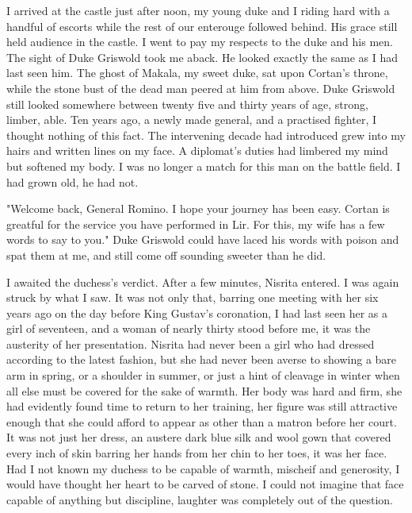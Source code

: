 \documentclass{article}
\begin{document}
\vspace{.5cm}

I arrived at the castle just after noon, my young duke and I riding hard with a handful of escorts while the rest of our enterouge followed behind. His grace still held audience in the castle. I went to pay my respects to the duke and his men. The sight of Duke Griswold took me aback. He looked exactly the same as I had last seen him. The ghost of Makala, my sweet duke, sat upon Cortan's throne, while the stone bust of the dead man peered at him from above. Duke Griswold still looked somewhere between twenty five and thirty years of age, strong, limber, able. Ten years ago, a newly made general, and a practised fighter, I thought nothing of this fact. The intervening decade had introduced grew into my hairs and written lines on my face. A diplomat's duties had limbered my mind but softened my body. I was no longer a match for this man on the battle field. I had grown old, he had not.

"Welcome back, General Romino. I hope your journey has been easy. Cortan is greatful for the service you have performed in Lir. For this, my wife has a few words to say to you." Duke Griswold could have laced his words with poison and spat them at me, and still come off sounding sweeter than he did. 

I awaited the duchess's verdict. After a few minutes, Nisrita entered. I was again struck by what I saw. It was not only that, barring one meeting with her six years ago on the day before King Gustav's coronation, I had last seen her as a girl of seventeen, and a woman of nearly thirty stood before me, it was the austerity of her presentation. Nisrita had never been a girl who had dressed according to the latest fashion, but she had never been averse to showing a bare arm in spring, or a shoulder in summer, or just a hint of cleavage in winter when all else must be covered for the sake of warmth. Her body was hard and firm, she had evidently found time to return to her training, her figure was still attractive enough that she could afford to appear as other than a matron before her court. It was not just her dress, an austere dark blue silk and wool gown that covered every inch of skin barring her hands from her chin to her toes, it was her face. Had I not known my duchess to be capable of warmth, mischeif and generosity, I would have thought her heart to be carved of stone. I could not imagine that face capable of anything but discipline, laughter was completely out of the question.
\end{document}
